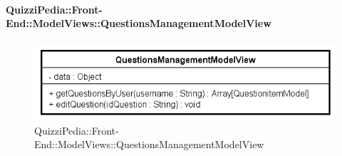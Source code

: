 \paragraph[QuizziPedia::Front-End::ModelViews\\::QuestionsManagementModelView]{QuizziPedia::Front-End::ModelViews::QuestionsManagementModelView}

\label{QuizziPedia::Front-End::ModelViews::QuestionsManagementModelView}

\begin{figure}[ht]
	\centering
	\includegraphics[scale=0.8,keepaspectratio]{UML/Classi/Front-End/QuizziPedia_Front-end_ModelView_QuestionsManagementModelView.png}
	\caption{QuizziPedia::Front-End::ModelViews::QuestionsManagementModelView}
\end{figure} \FloatBarrier

